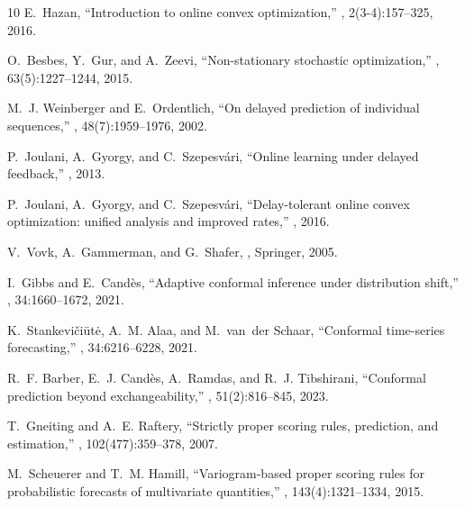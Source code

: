 \documentclass[10pt,journal,compsoc]{IEEEtran}
\begin{document}
\begin{thebibliography}{10}
E.~Hazan,
\newblock ``Introduction to online convex optimization,''
, 2(3-4):157--325, 2016.

O.~Besbes, Y.~Gur, and A.~Zeevi,
\newblock ``Non-stationary stochastic optimization,''
, 63(5):1227--1244, 2015.

M.~J. Weinberger and E.~Ordentlich,
\newblock ``On delayed prediction of individual sequences,''
, 48(7):1959--1976, 2002.

P.~Joulani, A.~Gyorgy, and C.~Szepesv{\'a}ri,
\newblock ``Online learning under delayed feedback,''
, 2013.

P.~Joulani, A.~Gyorgy, and C.~Szepesv{\'a}ri,
\newblock ``Delay-tolerant online convex optimization: unified analysis and improved rates,''
, 2016.

V.~Vovk, A.~Gammerman, and G.~Shafer,
,
\newblock Springer, 2005.

I.~Gibbs and E.~Cand{\`e}s,
\newblock ``Adaptive conformal inference under distribution shift,''
, 34:1660--1672, 2021.

K.~Stankevi{\v{c}}i{\=u}t{\.e}, A.~M. Alaa, and M.~van~der Schaar,
\newblock ``Conformal time-series forecasting,''
, 34:6216--6228, 2021.

R.~F. Barber, E.~J. Cand{\`e}s, A.~Ramdas, and R.~J. Tibshirani,
\newblock ``Conformal prediction beyond exchangeability,''
, 51(2):816--845, 2023.

T.~Gneiting and A.~E. Raftery,
\newblock ``Strictly proper scoring rules, prediction, and estimation,''
, 102(477):359--378, 2007.

M.~Scheuerer and T.~M. Hamill,
\newblock ``Variogram-based proper scoring rules for probabilistic forecasts of multivariate quantities,''
, 143(4):1321--1334, 2015.

\end{thebibliography}
\end{document}
